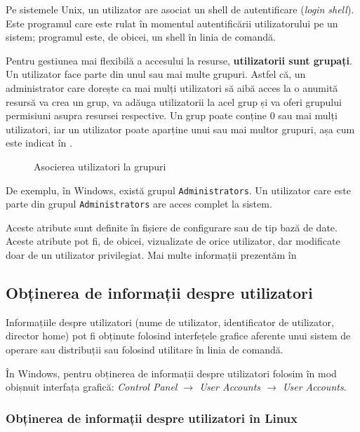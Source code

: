 Pe sistemele Unix, un utilizator are asociat un shell de autentificare (\textit{login
shell}). Este programul care este rulat în momentul autentificării utilizatorului
pe un sistem; programul este, de obicei, un shell în linia de comandă.

Pentru gestiunea mai flexibilă a accesului la resurse, \textbf{utilizatorii sunt
grupați}. Un utilizator face parte din unul sau mai multe grupuri. Astfel că, un
administrator care dorește ca mai mulți utilizatori să aibă acces la o anumită
resursă va crea un grup, va adăuga utilizatorii la acel grup și va oferi
grupului permisiuni asupra resursei respective. Un grup poate conține 0 sau mai
mulți utilizatori, iar un utilizator poate aparține unui sau mai multor grupuri,
așa cum este indicat în .

\begin{figure}[htbp]
	\centering
	\def\svgwidth{\columnwidth}
	
        \caption{Asocierea utilizatori la grupuri}
	\label{fig:user:multi-user}
\end{figure}

De exemplu, în Windows, există grupul \texttt{Administrators}. Un utilizator care este
parte din grupul \texttt{Administrators} are acces complet la sistem.

Aceste atribute sunt definite în fișiere de configurare sau de tip bază de date.
Aceste atribute pot fi, de obicei, vizualizate de orice utilizator, dar
modificate doar de un utilizator privilegiat. Mai multe informații prezentăm în

\subsection{Obținerea de informații despre utilizatori}
\label{sec:user:user:info}

Informațiile despre utilizatori (nume de utilizator, identificator de
utilizator, director home) pot fi obținute folosind interfețele grafice
aferente unui sistem de operare sau distribuții sau folosind utilitare în linia
de comandă.

În Windows, pentru obținerea de informații despre utilizatori folosim în mod
obișnuit interfața grafică: \textit{Control Panel $\rightarrow$ User Accounts $\rightarrow$ User Accounts}.

\subsubsection{Obținerea de informații despre utilizatori în Linux}
\label{sec:user:linux-user-info}

